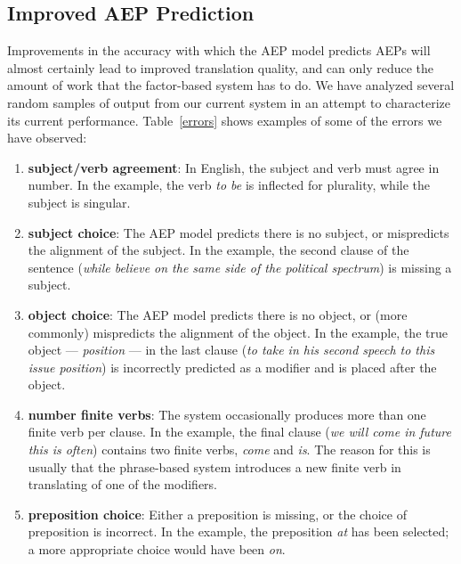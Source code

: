\documentclass[11pt]{report}
\theoremstyle{plain}
\begin{document}
{\subsection{Improved AEP Prediction}
Improvements in the accuracy with which the AEP model predicts AEPs
will almost certainly lead to improved translation quality, and can
only reduce the amount of work that the factor-based system has to
do. We have analyzed several random samples of output from our current
system in an attempt to characterize its current
performance. Table~\ref{errors} shows examples of some of the errors
we have observed:

\begin{enumerate}
\item {\bf subject/verb agreement}: In English, the subject and verb
must agree in number. In the example, the verb {\em to be} is
inflected for plurality, while the subject is singular.
\item {\bf subject choice}: The AEP model predicts there is no
subject, or mispredicts the alignment of the subject. In the example,
the second clause of the sentence ({\em while believe on the same side
of the political spectrum}) is missing a subject.
\item {\bf object choice}: The AEP model predicts there is no object,
or (more commonly) mispredicts the alignment of the object. In the
example, the true object --- {\em position} --- in the last clause
({\em to take in his second speech to this issue position}) is
incorrectly predicted as a modifier and is placed after the object.
\item {\bf number finite verbs}: The system occasionally produces more
than one finite verb per clause. In the example, the final clause
({\em we will come in future this is often}) contains two finite
verbs, {\em come} and {\em is}. The reason for this is usually that
the phrase-based system introduces a new finite verb in translating of
one of the modifiers.
\item {\bf preposition choice}: Either a preposition is missing, or
the choice of preposition is incorrect. In the example, the
preposition {\em at} has been selected; a more appropriate choice
would have been {\em on}.
\end{enumerate}

}
\end{document}
